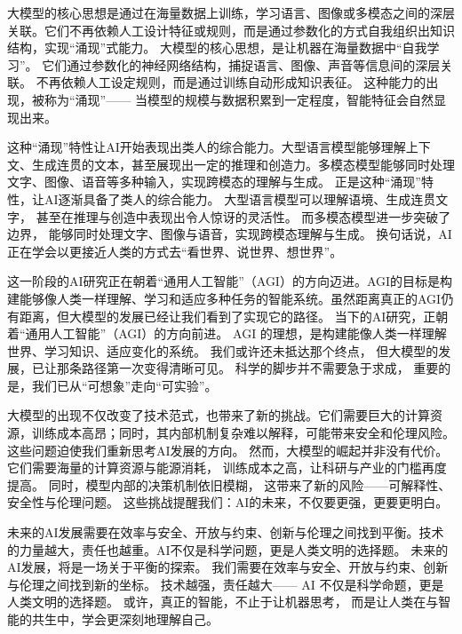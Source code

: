 大模型的核心思想是通过在海量数据上训练，学习语言、图像或多模态之间的深层关联。它们不再依赖人工设计特征或规则，而是通过参数化的方式自我组织出知识结构，实现“涌现”式能力。
大模型的核心思想，是让机器在海量数据中“自我学习”。  
它们通过参数化的神经网络结构，捕捉语言、图像、声音等信息间的深层关联。  
不再依赖人工设定规则，而是通过训练自动形成知识表征。  
这种能力的出现，被称为“涌现”——  
当模型的规模与数据积累到一定程度，智能特征会自然显现出来。  

这种“涌现”特性让AI开始表现出类人的综合能力。大型语言模型能够理解上下文、生成连贯的文本，甚至展现出一定的推理和创造力。多模态模型能够同时处理文字、图像、语音等多种输入，实现跨模态的理解与生成。
正是这种“涌现”特性，让AI逐渐具备了类人的综合能力。  
大型语言模型可以理解语境、生成连贯文字，  
甚至在推理与创造中表现出令人惊讶的灵活性。  
而多模态模型进一步突破了边界，  
能够同时处理文字、图像与语音，实现跨模态理解与生成。  
换句话说，AI正在学会以更接近人类的方式去“看世界、说世界、想世界”。  

这一阶段的AI研究正在朝着“通用人工智能”（AGI）的方向迈进。AGI的目标是构建能够像人类一样理解、学习和适应多种任务的智能系统。虽然距离真正的AGI仍有距离，但大模型的发展已经让我们看到了实现它的路径。
当下的AI研究，正朝着“通用人工智能”（AGI）的方向前进。  
AGI 的理想，是构建能像人类一样理解世界、学习知识、适应变化的系统。  
我们或许还未抵达那个终点，  
但大模型的发展，已让那条路径第一次变得清晰可见。  
科学的脚步并不需要急于求成，  
重要的是，我们已从“可想象”走向“可实验”。  

大模型的出现不仅改变了技术范式，也带来了新的挑战。它们需要巨大的计算资源，训练成本高昂；同时，其内部机制复杂难以解释，可能带来安全和伦理风险。这些问题迫使我们重新思考AI发展的方向。
然而，大模型的崛起并非没有代价。  
它们需要海量的计算资源与能源消耗，  
训练成本之高，让科研与产业的门槛再度提高。  
同时，模型内部的决策机制依旧模糊，  
这带来了新的风险——可解释性、安全性与伦理问题。  
这些挑战提醒我们：AI的未来，不仅要更强，更要更明白。  

未来的AI发展需要在效率与安全、开放与约束、创新与伦理之间找到平衡。技术的力量越大，责任也越重。AI不仅是科学问题，更是人类文明的选择题。
未来的AI发展，将是一场关于平衡的探索。  
我们需要在效率与安全、开放与约束、创新与伦理之间找到新的坐标。  
技术越强，责任越大——  
AI 不仅是科学命题，更是人类文明的选择题。  
或许，真正的智能，不止于让机器思考，  
而是让人类在与智能的共生中，学会更深刻地理解自己。  


\nocite{*}
